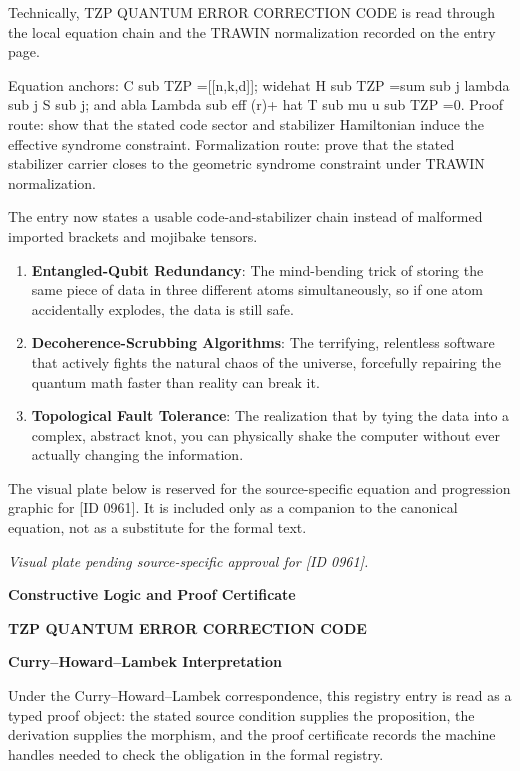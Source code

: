 Technically, TZP QUANTUM ERROR CORRECTION CODE is read through the local equation chain and the TRAWIN normalization recorded on the entry page.

Equation anchors: C sub TZP =[[n,k,d]]; widehat H sub TZP =sum sub j lambda sub j S sub j; and abla Lambda sub eff (r)+ hat T sub mu u sub TZP =0. Proof route: show that the stated code sector and stabilizer Hamiltonian induce the effective syndrome constraint. Formalization route: prove that the stated stabilizer carrier closes to the geometric syndrome constraint under TRAWIN normalization.

The entry now states a usable code-and-stabilizer chain instead of malformed imported brackets and mojibake tensors.
\endgroup

\begin{enumerate}[leftmargin=1.6em,itemsep=6pt,topsep=4pt]
\item \textbf{Entangled-Qubit Redundancy}: The mind-bending trick of storing the same piece of data in three different atoms simultaneously, so if one atom accidentally explodes, the data is still safe.
\item \textbf{Decoherence-Scrubbing Algorithms}: The terrifying, relentless software that actively fights the natural chaos of the universe, forcefully repairing the quantum math faster than reality can break it.
\item \textbf{Topological Fault Tolerance}: The realization that by tying the data into a complex, abstract knot, you can physically shake the computer without ever actually changing the information.
\end{enumerate}

\begingroup\footnotesize\sloppy
The visual plate below is reserved for the source-specific equation and progression graphic for [ID 0961]. It is included only as a companion to the canonical equation, not as a substitute for the formal text.
\par\endgroup
\begingroup\footnotesize\itshape
Visual plate pending source-specific approval for [ID 0961].
\par\endgroup

\clearpage
\begingroup\tzpsupportsetup
\noindent\textbf{\fontsize{10.8pt}{12.8pt}\selectfont [ID 0961] Constructive Logic and Proof Certificate}\par
\noindent\textbf{\fontsize{10pt}{12pt}\selectfont TZP QUANTUM ERROR CORRECTION CODE}\par
\vspace{0.45em}
\begingroup
\footnotesize
\setlength{\parskip}{0.22em}
\setlength{\parindent}{0pt}
\noindent\textbf{Curry--Howard--Lambek Interpretation}\par
Under the Curry--Howard--Lambek correspondence, this registry entry is read as a typed proof
object: the stated source condition supplies the proposition, the derivation supplies the
morphism, and the proof certificate records the machine handles needed to check the obligation
in the formal registry.

